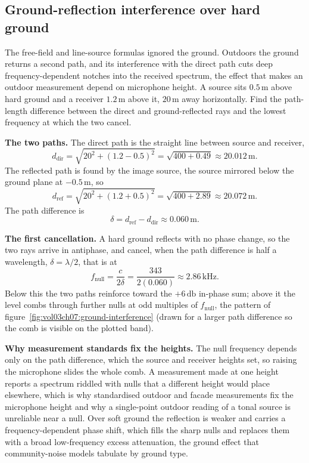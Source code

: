 \subsection{Ground-reflection interference over hard ground}

The free-field and line-source formulas ignored the ground. Outdoors the
ground returns a second path, and its interference with the direct path cuts
deep frequency-dependent notches into the received spectrum, the effect that
makes an outdoor measurement depend on microphone height. A source sits
$0.5\,\si{\meter}$ above hard ground and a receiver $1.2\,\si{\meter}$ above
it, $20\,\si{\meter}$ away horizontally. Find the path-length difference
between the direct and ground-reflected rays and the lowest frequency at
which the two cancel.

\textbf{The two paths.} The direct path is the straight line between source
and receiver,
\[
d_{\text{dir}} = \sqrt{20^2 + (1.2-0.5)^2} = \sqrt{400 + 0.49}
             \approx 20.012\,\si{\meter}.
\]
The reflected path is found by the image source, the source mirrored below
the ground plane at $-0.5\,\si{\meter}$, so
\[
d_{\text{ref}} = \sqrt{20^2 + (1.2+0.5)^2} = \sqrt{400 + 2.89}
             \approx 20.072\,\si{\meter}.
\]
The path difference is
\[
\delta = d_{\text{ref}} - d_{\text{dir}} \approx 0.060\,\si{\meter}.
\]

\textbf{The first cancellation.} A hard ground reflects with no phase change,
so the two rays arrive in antiphase, and cancel, when the path difference is
half a wavelength, $\delta = \lambda/2$, that is at
\[
f_{\text{null}} = \frac{c}{2\delta} = \frac{343}{2(0.060)}
              \approx 2.86\,\si{\kilo\hertz}.
\]
Below this the two paths reinforce toward the $+6\,\si{\decibel}$ in-phase
sum; above it the level combs through further nulls at odd multiples of
$f_{\text{null}}$, the pattern of figure~\ref{fig:vol03ch07:ground-interference}
(drawn for a larger path difference so the comb is visible on the plotted
band).

\textbf{Why measurement standards fix the heights.} The null frequency
depends only on the path difference, which the source and receiver heights
set, so raising the microphone slides the whole comb. A measurement made at
one height reports a spectrum riddled with nulls that a different height
would place elsewhere, which is why standardised outdoor and facade
measurements fix the microphone height and why a single-point outdoor
reading of a tonal source is unreliable near a null. Over soft ground the
reflection is weaker and carries a frequency-dependent phase shift, which
fills the sharp nulls and replaces them with a broad low-frequency excess
attenuation, the ground effect that community-noise models tabulate by
ground type.

